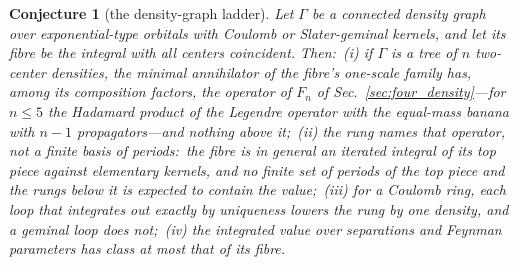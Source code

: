 \documentclass[aps,pra,twocolumn,superscriptaddress,longbibliography]{revtex4-2}
\newtheorem{conjecture}{Conjecture}
\begin{document}
\begin{conjecture}[the density-graph ladder]
\label{conj:ladder}
Let $\Gamma$ be a connected density graph over exponential-type orbitals with
Coulomb or Slater-geminal kernels, and let its fibre be the integral with
all centers coincident.  Then:\ (i) if $\Gamma$ is a tree of $n$ two-center
densities, the minimal annihilator of the fibre's one-scale family has, among
its composition factors, the operator of $F_n$ of
Sec.~\ref{sec:four_density}---for $n\le5$ the Hadamard product of the
Legendre operator with the equal-mass banana with $n-1$ propagators---and
nothing above it;\
(ii) the rung names that operator, not a finite basis of periods:\ the fibre
is in general an iterated integral of its top piece against elementary
kernels, and no finite set of periods of the top piece and the rungs below
it is expected to contain the value;\ (iii) for a Coulomb ring, each loop
that integrates out exactly by uniqueness lowers the rung by one density, and
a geminal loop does not;\ (iv) the integrated value over separations and
Feynman parameters has class at most that of its fibre.
\end{conjecture}
\end{document}
